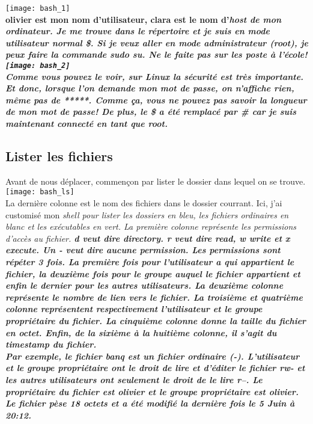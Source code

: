 \documentclass[12pt,oneside,final]{article}
\begin{document}
\texttt{[image: bash\_1]} \\


\bf{olivier} est mon nom d'utilisateur, \bf{clara} est le nom
d'\it{host} de mon ordinateur. Je me trouve dans le répertoire
 et je suis en mode utilisateur normal \bf{\$}. Si
je veux aller en mode administrateur (\bf{root}), je peux faire la
commande \bf{sudo su}. Ne le faite pas sur les poste à l'école! \\

\texttt{[image: bash\_2]} \\

Comme vous pouvez le voir, sur \it{Linux} la sécurité est très
importante. Et donc, lorsque l'on demande mon mot de passe, on n'affiche
rien, même pas de \bf{*****}. Comme ça, vous ne pouvez pas savoir la
longueur de mon mot de passe! De plus, le \bf{\$} a été remplacé par
\bf{\#} car je suis maintenant connecté en tant que \bf{root}.

\newpage
\subsection{Lister les fichiers}
Avant de nous déplacer, commençon par lister le dossier dans lequel on
se trouve. \\

\texttt{[image: bash\_ls]} \\

La dernière colonne est le nom des fichiers dans le dossier
courrant. Ici, j'ai customisé mon \it{shell} pour lister les dossiers
en bleu, les fichiers ordinaires en blanc et les exécutables en
vert. La première colonne représente les permissions d'accès au
fichier. \bf{d} veut dire \it{directory}. \bf{r} veut dire \it{read},
\bf{w} write et \bf{x} \it{execute}. Un \bf{-} veut dire aucune
permission. Les permissions sont répéter 3 fois. La première fois pour
l'utilisateur a qui appartient le fichier, la deuxième fois pour le
groupe auquel le fichier appartient et enfin le dernier pour les
autres utilisateurs. La deuxième colonne représente le nombre de lien
vers le fichier. La troisième et quatrième colonne représentent
respectivement l'utilisateur et le groupe propriétaire du fichier. La
cinquième colonne donne la taille du fichier en octet. Enfin, de la
sixième à la huitième colonne, il s'agit du \it{timestamp} du fichier. \\

Par exemple, le fichier \bf{banq} est un fichier ordinaire
(\bf{-}). L'utilisateur et le groupe propriétaire ont le droit de lire
et d'éditer le fichier \bf{rw-} et les autres utilisateurs ont
seulement le droit de le lire \bf{r--}. Le propriétaire du fichier est
\bf{olivier} et le groupe propriétaire est \bf{olivier}. Le fichier
pèse 18 octets et a été modifié la dernière fois le 5 Juin à 20:12. \\
\end{document}

